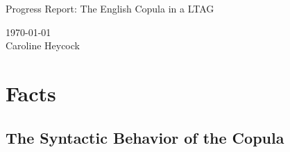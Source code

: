 \pagestyle{myheadings}
\newcommand{\marginfix}{
\setlength{\oddsidemargin}{0.1in}
\setlength{\evensidemargin}{0.1in}
\setlength{\topmargin}{-37pt}
\setlength{\textwidth}{6.5in}
\setlength{\textheight}{9in}
}
\marginfix




\begin{center}
{\LARGE Progress Report: The English Copula in a LTAG}
\end{center}
\vspace{2mm}
\begin{center}
{\large \today} \\
{\large Caroline Heycock} \\
\end{center}
\vspace{4mm}

\section{Facts}

\label{facts}

\subsection{The Syntactic Behavior of the Copula}


